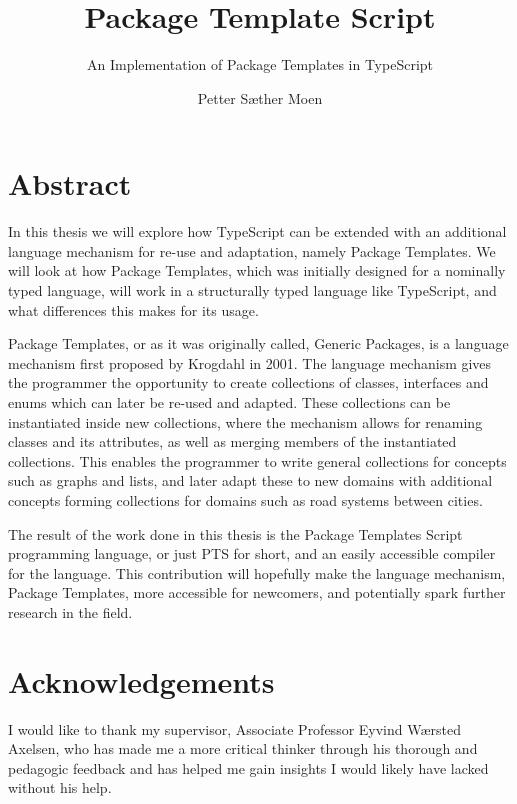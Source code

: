 \documentclass[UKenglish]{ifimaster}
\title{Package Template Script}
\subtitle{An Implementation of Package Templates in TypeScript}
\author{Petter Sæther Moen}
\begin{document}
%


\duoforside[dept={Department of Informatics},
  program={Informatics: Programming and System Architecture},
  long]

\frontmatter{}

\clearpage
\section*{Abstract}

In this thesis we will explore how TypeScript can be extended with an additional language mechanism for re-use and adaptation, namely Package Templates.
We will look at how Package Templates, which was initially designed for a nominally typed language, will work in a structurally typed language like TypeScript, and what differences this makes for its usage.

Package Templates, or as it was originally called, Generic Packages, is a language mechanism first proposed by Krogdahl in 2001.
The language mechanism gives the programmer the opportunity to create collections of classes, interfaces and enums which can later be re-used and adapted.
These collections can be instantiated inside new collections, where the mechanism allows for renaming classes and its attributes, as well as merging members of the instantiated collections.
This enables the programmer to write general collections for concepts such as graphs and lists, and later adapt these to new domains with additional concepts forming collections for domains such as road systems between cities.

The result of the work done in this thesis is the Package Templates Script programming language, or just PTS for short, and an easily accessible compiler for the language.
This contribution will hopefully make the language mechanism, Package Templates, more accessible for newcomers, and potentially spark further research in the field.

\cleardoublepage

\section*{Acknowledgements}

I would like to thank my supervisor, Associate Professor Eyvind Wærsted Axelsen, who has made me a more critical thinker through his thorough and pedagogic feedback and has helped me gain insights I would likely have lacked without his help.
\end{document}
